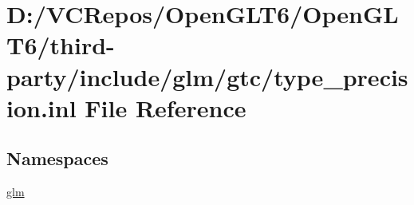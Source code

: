 \hypertarget{type__precision_8inl}{}\section{D\+:/\+V\+C\+Repos/\+Open\+G\+L\+T6/\+Open\+G\+L\+T6/third-\/party/include/glm/gtc/type\+\_\+precision.inl File Reference}
\label{type__precision_8inl}
\subsection*{Namespaces}
\begin{DoxyCompactItemize}
\item 
 \mbox{\hyperlink{namespaceglm}{glm}}
\end{DoxyCompactItemize}
